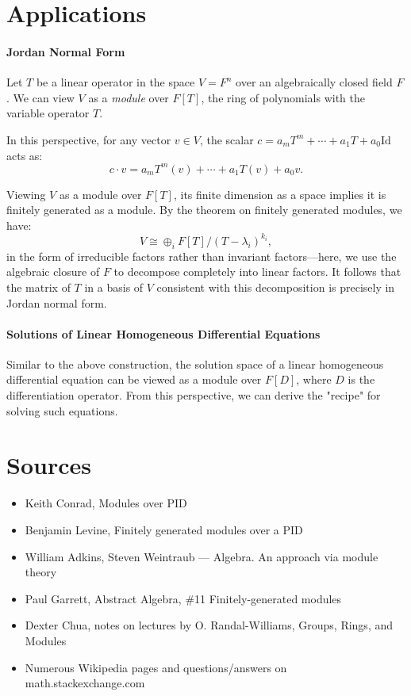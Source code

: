 \documentclass{article}
\newif\ifusemulticols
\theoremstyle{definition}
\theoremstyle{remark}
\theoremstyle{plain}
\theoremstyle{plain}
\newenvironment{mymulticols}
    { \ifusemulticols \begin{multicols}{2} \fi }
    { \ifusemulticols \end{multicols} \fi }
\begin{document}
\begin{mymulticols}
\section{Applications}%
\paragraph{Jordan Normal Form}
Let $T$ be a linear operator in the space $V = F^n$ over an algebraically closed field $F$. We can
view $V$ as a \emph{module} over $F[T]$, the ring of polynomials with the variable \quotedblbase
operator\quotedblright{} $T$.

In this perspective, for any vector $v \in V$, the scalar $c = a_m T^m + \cdots + a_1 T + a_0
\text{Id}$ acts as:
$$c \cdot v = a_m T^m(v) + \cdots + a_1 T(v) + a_0 v.$$

Viewing $V$ as a module over $F[T]$, its finite dimension as a space implies it is finitely
generated as a module. By the theorem on finitely generated modules, we have:
$$V \cong \oplus_i F[T] / (T - \lambda_i)^{k_i},$$
in the form of irreducible factors rather than invariant factors—here, we use the algebraic closure
of $F$ to decompose completely into linear factors. It follows that the matrix of $T$ in a basis of
$V$ consistent with this decomposition is precisely in Jordan normal form.

\paragraph{Solutions of Linear Homogeneous Differential Equations}
Similar to the above construction, the solution space of a linear homogeneous differential equation
can be viewed as a module over $F[D]$, where $D$ is the differentiation operator. From this
perspective, we can derive the "recipe" for solving such equations.

\section{Sources}%

\begin{itemize}
    \item Keith Conrad, Modules over PID
    \item Benjamin Levine, Finitely generated modules over a PID
    \item William Adkins, Steven Weintraub — Algebra. An approach via module theory
    \item Paul Garrett, Abstract Algebra, \#11 Finitely-generated modules
    \item Dexter Chua, notes on lectures by O. Randal-Williams, Groups, Rings, and Modules
    \item Numerous Wikipedia pages and questions/answers on math.stackexchange.com
\end{itemize}

\end{mymulticols}
\end{document}
